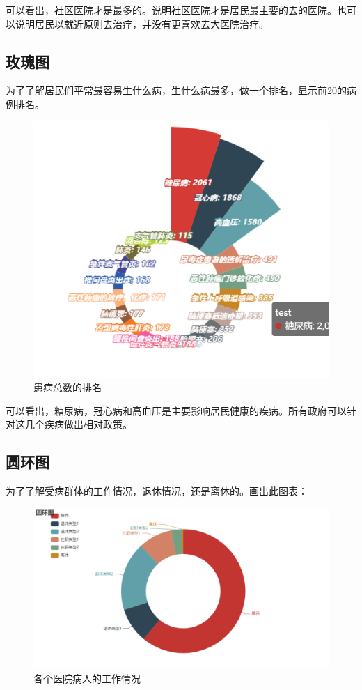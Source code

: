 \documentclass[12pt]{article}
\begin{document}
可以看出，社区医院才是最多的。说明社区医院才是居民最主要的去的医院。也可以说明居民以就近原则去治疗，并没有更喜欢去大医院治疗。

\newpage
\subsection{玫瑰图}
为了了解居民们平常最容易生什么病，生什么病最多，做一个排名，显示前20的病例排名。

\begin{figure}[ht]
\centering
\includegraphics[scale=0.7]{figures/9.png}
\caption{患病总数的排名}\label{fig:label2}
\end{figure}


可以看出，糖尿病，冠心病和高血压是主要影响居民健康的疾病。所有政府可以针对这几个疾病做出相对政策。

\newpage
\subsection{圆环图}

为了了解受病群体的工作情况，退休情况，还是离休的。画出此图表：

\begin{figure}[ht]
\centering
\includegraphics[scale=0.7]{figures/10.png}
\caption{各个医院病人的工作情况}\label{fig:label2}
\end{figure}
\end{document}
